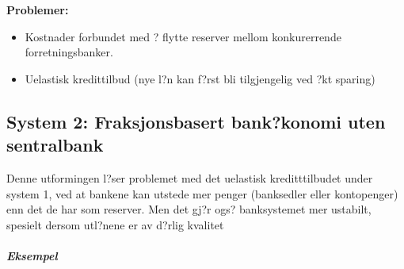 \documentclass[a4paper,notitlepage]{article}
\begin{document}
\noindent\textbf{Problemer:}\\
\begin{itemize}
\item Kostnader forbundet med ? flytte reserver mellom konkurerrende forretningsbanker.
\item Uelastisk kredittilbud (nye l?n kan f?rst bli tilgjengelig ved ?kt sparing)
\end{itemize}
\subsection{System 2: Fraksjonsbasert bank?konomi uten sentralbank}
Denne utformingen l?ser problemet med det uelastisk kreditttilbudet under system 1, ved at bankene kan utstede mer penger (banksedler eller kontopenger) enn det de har som reserver. Men det gj?r ogs? banksystemet mer ustabilt, spesielt dersom utl?nene er av d?rlig kvalitet\\
\noindent\textbf{\emph{\\ Eksempel}}\\
\end{document}
